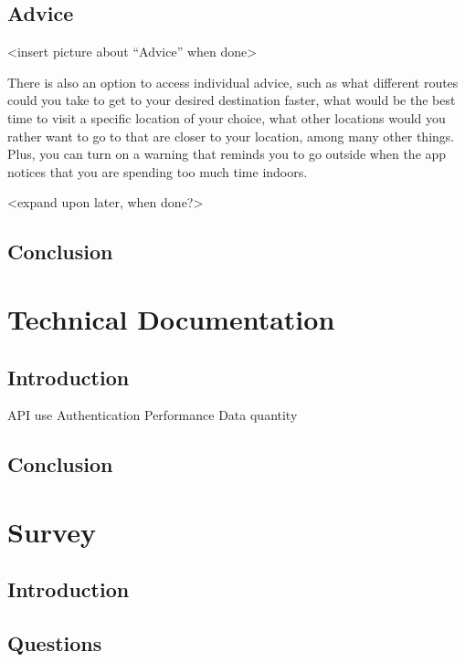 \documentclass[12p]{article}
\begin{document}
		\subsection{Advice}
		<insert picture about “Advice” when done>
		
		There is also an option to access individual advice, such as what different routes could you take to get to your desired destination faster, what would be the best time to visit a specific location of your choice, what other locations would you rather want to go to that are closer to your location, among many other things. Plus, you can turn on a warning that reminds you to go outside when the app notices that you are spending too much time indoors.
		
		<expand upon later, when done?>
		\subsection{Conclusion}
		
		
		\clearpage
		
		\section{Technical Documentation}
		\subsection{Introduction}
		API use
		Authentication
		Performance
		Data quantity
		
		\subsection{Conclusion}
		
		
		\newpage
		\section{Survey}
		\subsection{Introduction}
		\subsection{Questions}
\end{document}
